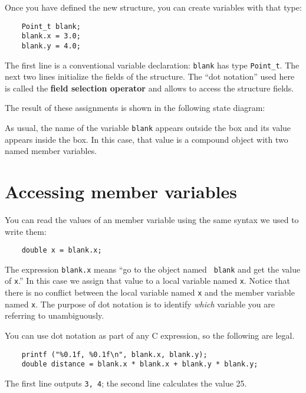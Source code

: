 Once you have defined the new structure, you can create variables
with that type:

\begin{verbatim}
	Point_t blank;
	blank.x = 3.0;
	blank.y = 4.0;   
\end{verbatim}
%
The first line is a conventional variable declaration: {\tt blank} has
type {\tt Point\_t}.  The next two lines initialize the fields of the
structure.  The ``dot notation'' used here is called the {\bf field selection
	operator} and allows to access the structure fields.


The result of these assignments is shown in the following
state diagram:

\vspace{0.1in}
\centerline{}
\vspace{0.1in}

As usual, the name of the variable {\tt blank} appears outside the box
and its value appears inside the box.  In this case, that value is
a compound object with two named member variables.

\section{Accessing member variables}

You can read the values of an member variable using the same syntax we
used to write them:

\begin{verbatim}
	double x = blank.x;
\end{verbatim}
%
The expression {\tt blank.x} means ``go to the object named {\tt
	blank} and get the value of {\tt x}.''  In this case we assign that
value to a local variable named {\tt x}.  Notice that there is no
conflict between the local variable named {\tt x} and the member
variable named {\tt x}.  The purpose of dot notation is to identify
{\em which} variable you are referring to unambiguously.

You can use dot notation as part of any C expression, so the
following are legal.

\begin{verbatim}
	printf ("%0.1f, %0.1f\n", blank.x, blank.y);
	double distance = blank.x * blank.x + blank.y * blank.y;
\end{verbatim}
%
The first line outputs {\tt 3, 4}; the second line calculates
the value 25.

